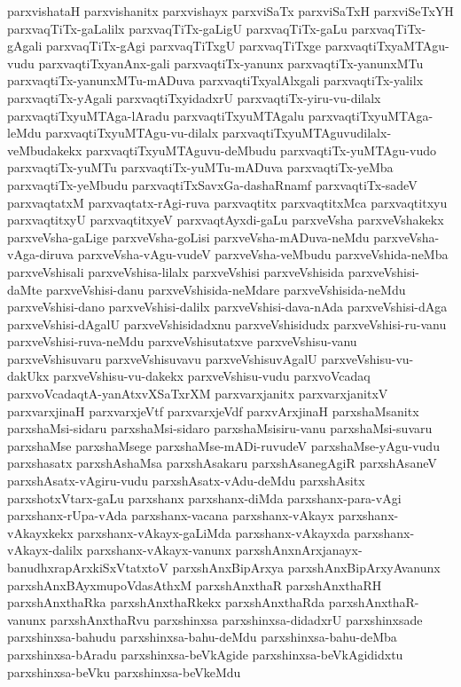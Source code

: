 {parxvishataH
parxvishanitx
parxvishayx
parxviSaTx
parxviSaTxH
parxviSeTxYH
parxvaqTiTx-gaLalilx
parxvaqTiTx-gaLigU
parxvaqTiTx-gaLu
parxvaqTiTx-gAgali
parxvaqTiTx-gAgi
parxvaqTiTxgU
parxvaqTiTxge
parxvaqtiTxyaMTAgu-vudu
parxvaqtiTxyanAnx-gali
parxvaqtiTx-yanunx
parxvaqtiTx-yanunxMTu
parxvaqtiTx-yanunxMTu-mADuva
parxvaqtiTxyalAlxgali
parxvaqtiTx-yalilx
parxvaqtiTx-yAgali
parxvaqtiTxyidadxrU
parxvaqtiTx-yiru-vu-dilalx
parxvaqtiTxyuMTAga-lAradu
parxvaqtiTxyuMTAgalu
parxvaqtiTxyuMTAga-leMdu
parxvaqtiTxyuMTAgu-vu-dilalx
parxvaqtiTxyuMTAguvudilalx-veMbudakekx
parxvaqtiTxyuMTAguvu-deMbudu
parxvaqtiTx-yuMTAgu-vudo
parxvaqtiTx-yuMTu
parxvaqtiTx-yuMTu-mADuva
parxvaqtiTx-yeMba
parxvaqtiTx-yeMbudu
parxvaqtiTxSavxGa-dashaRnamf
parxvaqtiTx-sadeV
parxvaqtatxM
parxvaqtatx-rAgi-ruva
parxvaqtitx
parxvaqtitxMca
parxvaqtitxyu
parxvaqtitxyU
parxvaqtitxyeV
parxvaqtAyxdi-gaLu
parxveVsha
parxveVshakekx
parxveVsha-gaLige
parxveVsha-goLisi
parxveVsha-mADuva-neMdu
parxveVsha-vAga-diruva
parxveVsha-vAgu-vudeV
parxveVsha-veMbudu
parxveVshida-neMba
parxveVshisali
parxveVshisa-lilalx
parxveVshisi
parxveVshisida
parxveVshisi-daMte
parxveVshisi-danu
parxveVshisida-neMdare
parxveVshisida-neMdu
parxveVshisi-dano
parxveVshisi-dalilx
parxveVshisi-dava-nAda
parxveVshisi-dAga
parxveVshisi-dAgalU
parxveVshisidadxnu
parxveVshisidudx
parxveVshisi-ru-vanu
parxveVshisi-ruva-neMdu
parxveVshisutatxve
parxveVshisu-vanu
parxveVshisuvaru
parxveVshisuvavu
parxveVshisuvAgalU
parxveVshisu-vu-dakUkx
parxveVshisu-vu-dakekx
parxveVshisu-vudu
parxvoVcadaq
parxvoVcadaqtA-yanAtxvXSaTxrXM
parxvarxjanitx
parxvarxjanitxV
parxvarxjinaH
parxvarxjeVtf
parxvarxjeVdf
parxvArxjinaH
parxshaMsanitx
parxshaMsi-sidaru
parxshaMsi-sidaro
parxshaMsisiru-vanu
parxshaMsi-suvaru
parxshaMse
parxshaMsege
parxshaMse-mADi-ruvudeV
parxshaMse-yAgu-vudu
parxshasatx
parxshAshaMsa
parxshAsakaru
parxshAsanegAgiR
parxshAsaneV
parxshAsatx-vAgiru-vudu
parxshAsatx-vAdu-deMdu
parxshAsitx
parxshotxVtarx-gaLu
parxshanx
parxshanx-diMda
parxshanx-para-vAgi
parxshanx-rUpa-vAda
parxshanx-vacana
parxshanx-vAkayx
parxshanx-vAkayxkekx
parxshanx-vAkayx-gaLiMda
parxshanx-vAkayxda
parxshanx-vAkayx-dalilx
parxshanx-vAkayx-vanunx
parxshAnxnArxjanayx-banudhxrapArxkiSxVtatxtoV
parxshAnxBipArxya
parxshAnxBipArxyAvanunx
parxshAnxBAyxmupoVdasAthxM
parxshAnxthaR
parxshAnxthaRH
parxshAnxthaRka
parxshAnxthaRkekx
parxshAnxthaRda
parxshAnxthaR-vanunx
parxshAnxthaRvu
parxshinxsa
parxshinxsa-didadxrU
parxshinxsade
parxshinxsa-bahudu
parxshinxsa-bahu-deMdu
parxshinxsa-bahu-deMba
parxshinxsa-bAradu
parxshinxsa-beVkAgide
parxshinxsa-beVkAgididxtu
parxshinxsa-beVku
parxshinxsa-beVkeMdu
}
